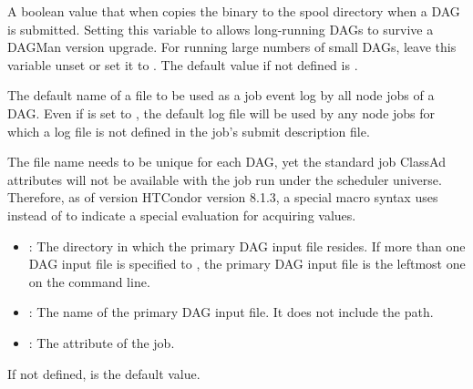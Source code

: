 \begin{description}
\label{param:DAGManCopyToSpool}
\item[\Macro{DAGMAN\_COPY\_TO\_SPOOL}]
  A boolean value that when  copies the  binary
  to the spool directory when a DAG is submitted.
  Setting this variable to  allows
  long-running DAGs to survive a DAGMan version upgrade.
  For running large numbers of small DAGs, leave this
  variable unset or set it to .
  The default value if not defined is .

\label{param:DAGManDefaultNodeLog}
\item[\Macro{DAGMAN\_DEFAULT\_NODE\_LOG}]
  The default name of a file to be used as a job event log by all node jobs
  of a DAG.
  Even if  is set to
  , the default log file will be used by any node jobs for which
  a log file is not defined in the job's submit description file.

  The file name needs to be unique for each DAG,
  yet the standard job ClassAd attributes will not be available 
  with the  job run under the scheduler universe. 
  Therefore, as of version HTCondor version 8.1.3, 
  a special macro syntax 
  uses  instead of \Bold{\Expr{\$}} to indicate
  a special evaluation for acquiring values.
  \begin{itemize}
  \item {}: The directory in which the primary DAG input file
  resides.
  If more than one DAG input file is specified to ,
  the primary DAG input file is the leftmost one on the command line.
  \item {}: The name of the primary DAG input file.
  It does not include the path.
  \item {}: The  attribute of 
  the  job.
  \end{itemize}

  If not defined, 
   is the default value.


\end{description}
